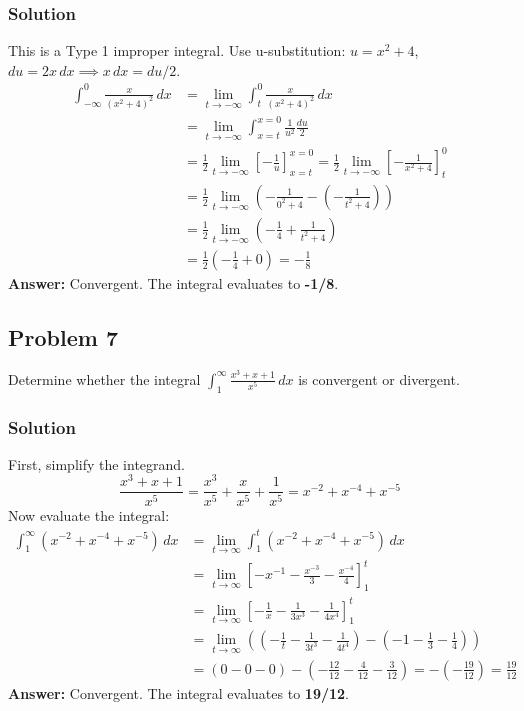 \documentclass{article}
\begin{document}
\subsubsection*{Solution}
This is a Type 1 improper integral. Use u-substitution: $ u = x^2+4 $, $ du = 2x \,dx \implies x\,dx = du/2 $.
\begin{align*}
    \int_{-\infty}^{0} \frac{x}{(x^2+4)^2} \,dx &= \lim_{t \to -\infty} \int_{t}^{0} \frac{x}{(x^2+4)^2} \,dx \\
    &= \lim_{t \to -\infty} \int_{x=t}^{x=0} \frac{1}{u^2} \frac{du}{2} \\
    &= \frac{1}{2} \lim_{t \to -\infty} \left[ -\frac{1}{u} \right]_{x=t}^{x=0} = \frac{1}{2} \lim_{t \to -\infty} \left[ -\frac{1}{x^2+4} \right]_{t}^{0} \\
    &= \frac{1}{2} \lim_{t \to -\infty} \left( -\frac{1}{0^2+4} - \left(-\frac{1}{t^2+4}\right) \right) \\
    &= \frac{1}{2} \lim_{t \to -\infty} \left( -\frac{1}{4} + \frac{1}{t^2+4} \right) \\
    &= \frac{1}{2} \left( -\frac{1}{4} + 0 \right) = -\frac{1}{8}
\end{align*}
\textbf{Answer:} Convergent. The integral evaluates to \textbf{-1/8}.

\subsection{Problem 7}
Determine whether the integral $ \int_{1}^{\infty} \frac{x^3+x+1}{x^5} \,dx $ is convergent or divergent.
\subsubsection*{Solution}
First, simplify the integrand.
\[ \frac{x^3+x+1}{x^5} = \frac{x^3}{x^5} + \frac{x}{x^5} + \frac{1}{x^5} = x^{-2} + x^{-4} + x^{-5} \]
Now evaluate the integral:
\begin{align*}
    \int_{1}^{\infty} (x^{-2} + x^{-4} + x^{-5}) \,dx &= \lim_{t \to \infty} \int_{1}^{t} (x^{-2} + x^{-4} + x^{-5}) \,dx \\
    &= \lim_{t \to \infty} \left[ -x^{-1} - \frac{x^{-3}}{3} - \frac{x^{-4}}{4} \right]_{1}^{t} \\
    &= \lim_{t \to \infty} \left[ -\frac{1}{x} - \frac{1}{3x^3} - \frac{1}{4x^4} \right]_{1}^{t} \\
    &= \lim_{t \to \infty} \left( \left(-\frac{1}{t} - \frac{1}{3t^3} - \frac{1}{4t^4}\right) - \left(-1 - \frac{1}{3} - \frac{1}{4}\right) \right) \\
    &= (0 - 0 - 0) - \left(-\frac{12}{12} - \frac{4}{12} - \frac{3}{12}\right) = - \left(-\frac{19}{12}\right) = \frac{19}{12}
\end{align*}
\textbf{Answer:} Convergent. The integral evaluates to \textbf{19/12}.
\end{document}
